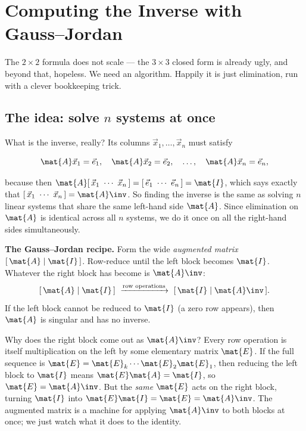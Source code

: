 \section{Computing the Inverse with Gauss--Jordan}
\label{ch08:gaussjordan}

The $2\times2$ formula does not scale --- the $3\times3$ closed form is already ugly, and
beyond that, hopeless. We need an algorithm. Happily it is just elimination, run with a
clever bookkeeping trick.

\subsection{The idea: solve $n$ systems at once}

What is the inverse, really? Its columns $\vec{x}_1,\dots,\vec{x}_n$ must satisfy

\[
\mat{A}\vec{x}_1 = \vec{e}_1,\quad
\mat{A}\vec{x}_2 = \vec{e}_2,\quad \dots,\quad
\mat{A}\vec{x}_n = \vec{e}_n,
\]

because then $\mat{A}[\,\vec{x}_1\ \cdots\ \vec{x}_n\,] = [\,\vec{e}_1\ \cdots\ \vec{e}_n\,]
= \mat{I}$, which says exactly that $[\,\vec{x}_1\ \cdots\ \vec{x}_n\,] = \mat{A}\inv$.
So finding the inverse is the same as solving $n$ linear systems that share the same
left-hand side $\mat{A}$. Since elimination on $\mat{A}$ is identical across all $n$
systems, we do it once on all the right-hand sides simultaneously.

\begin{focusbox}
\textbf{The Gauss--Jordan recipe.} Form the wide \emph{augmented matrix}
$[\,\mat{A}\mid\mat{I}\,]$. Row-reduce until the left block becomes $\mat{I}$. Whatever
the right block has become is $\mat{A}\inv$:
\[
[\,\mat{A}\mid \mat{I}\,] \ \xrightarrow{\text{row operations}}\ [\,\mat{I}\mid \mat{A}\inv\,].
\]
If the left block cannot be reduced to $\mat{I}$ (a zero row appears), then $\mat{A}$ is
singular and has no inverse.
\end{focusbox}

Why does the right block come out as $\mat{A}\inv$? Every row operation is itself
multiplication on the left by some elementary matrix $\mat{E}$. If the full sequence is
$\mat{E} = \mat{E}_k\cdots\mat{E}_2\mat{E}_1$, then reducing the left block to $\mat{I}$
means $\mat{E}\mat{A} = \mat{I}$, so $\mat{E} = \mat{A}\inv$. But the \emph{same}
$\mat{E}$ acts on the right block, turning $\mat{I}$ into $\mat{E}\mat{I} = \mat{E} =
\mat{A}\inv$. The augmented matrix is a machine for applying $\mat{A}\inv$ to both
blocks at once; we just watch what it does to the identity.

